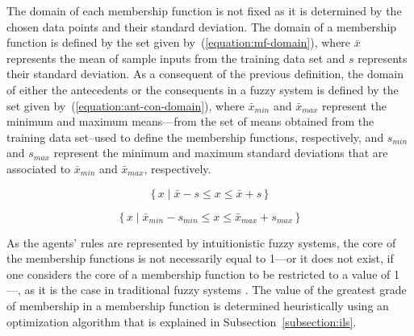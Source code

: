 \documentclass{ieeeaccess}
\begin{document}

The domain of each membership function is not fixed as it is
determined by the chosen data points and their standard deviation. The
domain of a membership function is defined by the set given
by~(\ref{equation:mf-domain}), where $\bar{x}$ represents the mean of
sample inputs from the training data set and $s$ represents their
standard deviation. As a consequent of the previous definition, the
domain of either the antecedents or the consequents in a fuzzy system
is defined by the set given by~(\ref{equation:ant-con-domain}), where
$\bar{x}_{min}$ and $\bar{x}_{max}$ represent the minimum and maximum
means---from the set of means obtained from the training data
set--used to define the membership functions, respectively, and
$s_{min}$ and $s_{max}$ represent the minimum and maximum standard
deviations that are associated to $\bar{x}_{min}$ and $\bar{x}_{max}$,
respectively. %


\begin{equation}
  \label{equation:mf-domain}
  \{\,x \mid \bar{x} - s \leq x \leq \bar{x} + s \,\}
\end{equation}

\begin{equation}
  \label{equation:ant-con-domain}
  \{\,x \mid \bar{x}_{min} - s_{min} \leq x \leq \bar{x}_{max} + s_{max} \,\}
\end{equation}

As the agents' rules are represented by intuitionistic fuzzy systems, the core of
the membership functions is not necessarily equal to 1---or it does not exist,
if one considers the core of a membership function to be restricted to a value
of 1---, as it is the case in traditional fuzzy systems \cite{wygralak2000axiomatic}. %
The value of the greatest
grade of membership in a membership function is determined heuristically using
an optimization algorithm that is explained in
Subsection~\ref{subsection:ils}.
\end{document}
